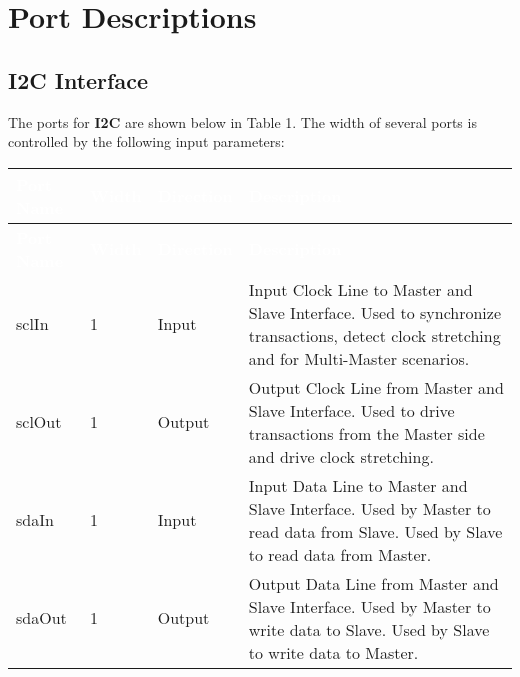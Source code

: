 \section{Port Descriptions}

\subsection{I2C Interface}

The ports for \textbf{I2C} are shown below in 
Table 1. The width of several ports is controlled 
by the following input parameters:

\renewcommand*{\arraystretch}{1.4}

\begingroup
\small


\begin{longtable}[H]{
  | p{}
  | p{}
  | p{}
  | p{} |
}

\hline
\rowcolor{gray}
\textcolor{white}{\textbf{Port Name}} & 
\textcolor{white}{\textbf{Width}} & 
\textcolor{white}{\textbf{Direction}} & 
\textcolor{white}{\textbf{Description}} \\ \hline
\endfirsthead

\hline
\rowcolor{gray}
\textcolor{white}{\textbf{Port Name}} & 
\textcolor{white}{\textbf{Width}} & 
\textcolor{white}{\textbf{Direction}} & 
\textcolor{white}{\textbf{Description}}\\ \hline
\endhead

\hline
\endfoot

sclIn & 
1 & 
Input &
Input Clock Line to Master and Slave Interface. Used to synchronize transactions, detect clock stretching and for Multi-Master scenarios. \\ \hline

sclOut &
1 &
Output &
Output Clock Line from Master and Slave Interface. Used to drive transactions from the Master side and drive clock stretching. \\ \hline

sdaIn &
1 &
Input &
Input Data Line to Master and Slave Interface. Used by Master to read data from Slave. Used by Slave to read data from Master. \\ \hline

sdaOut &
1 &
Output &
Output Data Line from Master and Slave Interface. Used by Master to write data to Slave. Used by Slave to write data to Master. \\ \hline

\end{longtable}
\captionsetup{aboveskip=0pt}
\label{table:ports}
\endgroup


